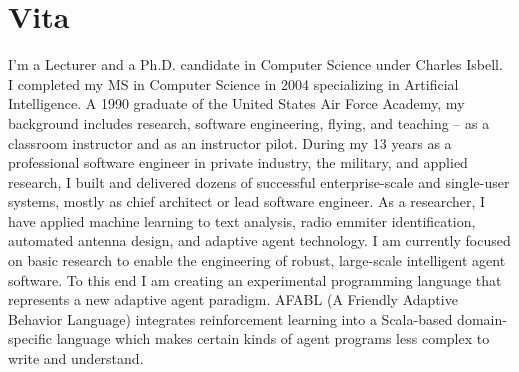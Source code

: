 \chapter*{Vita}


I'm a Lecturer and a Ph.D. candidate in Computer Science under Charles Isbell. I completed my MS in Computer Science in 2004 specializing in Artificial Intelligence. A 1990 graduate of the United States Air Force Academy, my background includes research, software engineering, flying, and teaching -- as a classroom instructor and as an instructor pilot. During my 13 years as a professional software engineer in private industry, the military, and applied research, I built and delivered dozens of successful enterprise-scale and single-user systems, mostly as chief architect or lead software engineer. As a researcher, I have applied machine learning to text analysis, radio emmiter identification, automated antenna design, and adaptive agent technology. I am currently focused on basic research to enable the engineering of robust, large-scale intelligent agent software. To this end I am creating an experimental programming language that represents a new adaptive agent paradigm. AFABL (A Friendly Adaptive Behavior Language) integrates reinforcement learning into a Scala-based domain-specific language which makes certain kinds of agent programs less complex to write and understand.
